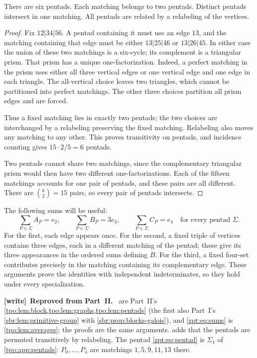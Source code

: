 \documentclass[11pt,letterpaper]{article}
\numberwithin{equation}{section}
\theoremstyle{definition}
\theoremstyle{remark}
\newenvironment{writenote}[1][]{\par\smallskip\begingroup\small
 \noindent\textbf{[write]}\if\relax\detokenize{#1}\relax\else~\textbf{#1.}\fi\ }%
 {\par\endgroup\smallskip}
\begin{document}
\begin{lemma}
\label{zpt:lem:pentads}
There are six pentads. Each matching belongs to two pentads. Distinct
pentads intersect in one matching. All pentads are related by a relabeling
of the vertices.
\end{lemma}
\begin{proof}
Fix $12|34|56$. A pentad containing it must use an edge $13$, and the
matching containing that edge must be either $13|25|46$ or $13|26|45$.
In either case the union of these two matchings is a six-cycle; its
complement is a triangular prism. That prism has a unique
one-factorization. Indeed, a perfect matching in the prism uses either
all three vertical edges or one vertical edge and one edge in each
triangle. The all-vertical choice leaves two triangles, which cannot be
partitioned into perfect matchings. The other three choices partition all
prism edges and are forced.

Thus a fixed matching lies in exactly two pentads; the two choices are
interchanged by a relabeling preserving the fixed matching. Relabeling also
moves any matching to any other. This proves transitivity on pentads, and
incidence counting gives $15\cdot2/5=6$ pentads.

Two pentads cannot share two matchings, since the complementary triangular
prism would then have two different one-factorizations. Each of the fifteen
matchings accounts for one pair of pentads, and these pairs are all
different. There are $\binom62=15$ pairs, so every pair of pentads intersects.
\end{proof}

The following sums will be useful:
\begin{equation}
 \sum_{P\in\Sigma}A_P=e_2,\qquad
 \sum_{P\in\Sigma}B_P=3e_3,\qquad
 \sum_{P\in\Sigma}C_P=e_4
 \quad\text{for every pentad }\Sigma.\label{zpt:eq:sums}
\end{equation}
For the first, each edge appears once. For the second, a fixed triple of
vertices contains three edges, each in a different matching of the pentad;
these give its three appearances in the ordered sums defining $B$.
For the third, a fixed four-set contributes precisely in the matching
containing its complementary edge. These arguments prove the identities
with independent indeterminates, so they hold under every specialization.

\begin{writenote}[Reproved from Part~II]
 are Part~II's
\cref{tpo:lem:block,tpo:lem:graphs,tpo:lem:pentads} (the first also Part~I's
\cref{sbr:lem:primitive-group} with \cref{sbr:prop:blocks-galois}), and
\eqref{zpt:eq:sums} is \cref{tpo:lem:averages}; the proofs are the same
arguments.  adds that the pentads are permuted
transitively by relabeling. The pentad \eqref{zpt:eq:pentad} is $\Sigma_1$
of \cref{tpo:app:pentads}: $P_0,\ldots,P_4$ are matchings $1,5,9,11,13$
there.
\end{writenote}
\end{document}
